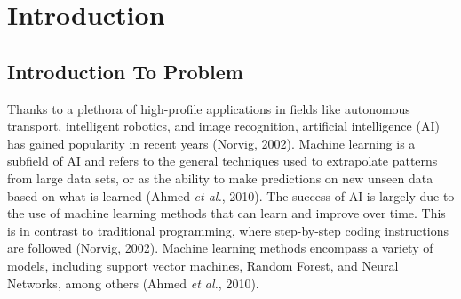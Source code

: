 
\chapter{Introduction} %

\label{Chapter1} %


\newcommand{\keyword}[1]{\textbf{#1}}
\newcommand{\tabhead}[1]{\textbf{#1}}
\newcommand{\code}[1]{\texttt{#1}}
\newcommand{\file}[1]{\texttt{\bfseries#1}}
\newcommand{\option}[1]{\texttt{\itshape#1}}




\section{Introduction To Problem}

Thanks to a plethora of high-profile applications in fields like autonomous transport, intelligent robotics, and image recognition, artificial intelligence (AI) has gained popularity in recent years (Norvig, 2002). Machine learning is a subfield of AI and refers to the general techniques used to extrapolate patterns from large data sets, or as the ability to make predictions on new unseen data based on what is learned (Ahmed \textit{et al.}, 2010). The success of AI is largely due to the use of machine learning methods that can learn and improve over time. This is in contrast to traditional programming, where step-by-step coding instructions are followed (Norvig, 2002). Machine learning methods encompass a variety of models, including support vector machines, Random Forest, and Neural Networks, among others (Ahmed \textit{et al.}, 2010). 

